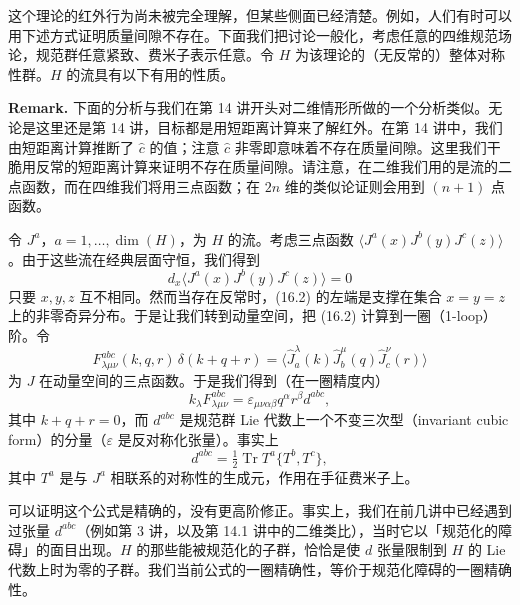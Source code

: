 这个理论的红外行为尚未被完全理解，但某些侧面已经清楚。例如，人们有时可以用下述方式证明质量间隙不存在。下面我们把讨论一般化，考虑任意的四维规范场论，规范群任意紧致、费米子表示任意。令 $H$ 为该理论的（无反常的）整体对称性群。$H$ 的流具有以下有用的性质。

\textbf{Remark.} 下面的分析与我们在第 14 讲开头对二维情形所做的一个分析类似。无论是这里还是第 14 讲，目标都是用短距离计算来了解红外。在第 14 讲中，我们由短距离计算推断了 $\widehat{c}$ 的值；注意 $\widehat{c}$ 非零即意味着不存在质量间隙。这里我们干脆用反常的短距离计算来证明不存在质量间隙。请注意，在二维我们用的是流的二点函数，而在四维我们将用三点函数；在 $2n$ 维的类似论证则会用到 $(n+1)$ 点函数。


令 $J^a$，$a=1,\dots,\dim(H)$，为 $H$ 的流。考虑三点函数 $\langle J^a(x)J^b(y)J^c(z)\rangle$。由于这些流在经典层面守恒，我们得到
\begin{equation}
  \tag{16.2}
  \label{eq:16-2}
  d_x\langle J^a(x)J^b(y)J^c(z)\rangle=0
\end{equation}
只要 $x,y,z$ 互不相同。然而当存在反常时，(16.2) 的左端是支撑在集合 $x=y=z$ 上的非零奇异分布。于是让我们转到动量空间，把 (16.2) 计算到一圈（1-loop）阶。令
\[
F^{abc}_{\lambda\mu\nu}(k,q,r)\,\delta(k+q+r)=\langle \widehat{J}^{\lambda}_a(k)\widehat{J}^{\mu}_b(q)\widehat{J}^{\nu}_c(r)\rangle
\]
为 $J$ 在动量空间的三点函数。于是我们得到（在一圈精度内）
\begin{equation}
  \tag{16.3}
  \label{eq:16-3}
  k_\lambda F^{abc}_{\lambda\mu\nu}=\varepsilon_{\mu\nu\alpha\beta}q^\alpha r^\beta d^{abc},
\end{equation}
其中 $k+q+r=0$，而 $d^{abc}$ 是规范群 Lie 代数上一个不变三次型（invariant cubic form）的分量（$\varepsilon$ 是反对称化张量）。事实上
\[
d^{abc}=\tfrac12\operatorname{Tr}T^a\{T^b,T^c\},
\]
其中 $T^a$ 是与 $J^a$ 相联系的对称性的生成元，作用在手征费米子上。


可以证明这个公式是精确的，没有更高阶修正。事实上，我们在前几讲中已经遇到过张量 $d^{abc}$（例如第 3 讲，以及第 14.1 讲中的二维类比），当时它以「规范化的障碍」的面目出现。$H$ 的那些能被规范化的子群，恰恰是使 $d$ 张量限制到 $H$ 的 Lie 代数上时为零的子群。我们当前公式的一圈精确性，等价于规范化障碍的一圈精确性。

